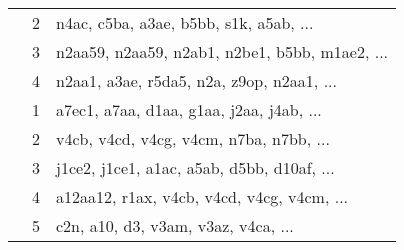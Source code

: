 \begin{table}[htbp]
\begin{tabularx}{\textwidth}{c c X}
	 & 2 & n4ac, c5ba, a3ae, b5bb, s1k, a5ab, ... \\
	 & 3 & n2aa59, n2aa59, n2ab1, n2be1, b5bb, m1ae2, ... \\
	 & 4 & n2aa1, a3ae, r5da5, n2a, z9op, n2aa1, ... \\
	\addlinespace
	8 & 1 & a7ec1, a7aa, d1aa, g1aa, j2aa, j4ab, ... \\
	 & 2 & v4cb, v4cd, v4cg, v4cm, n7ba, n7bb, ... \\
	 & 3 & j1ce2, j1ce1, a1ac, a5ab, d5bb, d10af, ... \\
	 & 4 & a12aa12, r1ax, v4cb, v4cd, v4cg, v4cm, ... \\
	 & 5 & c2n, a10, d3, v3am, v3az, v4ca, ... \\
	\bottomrule
\end{tabularx}
\end{table}


